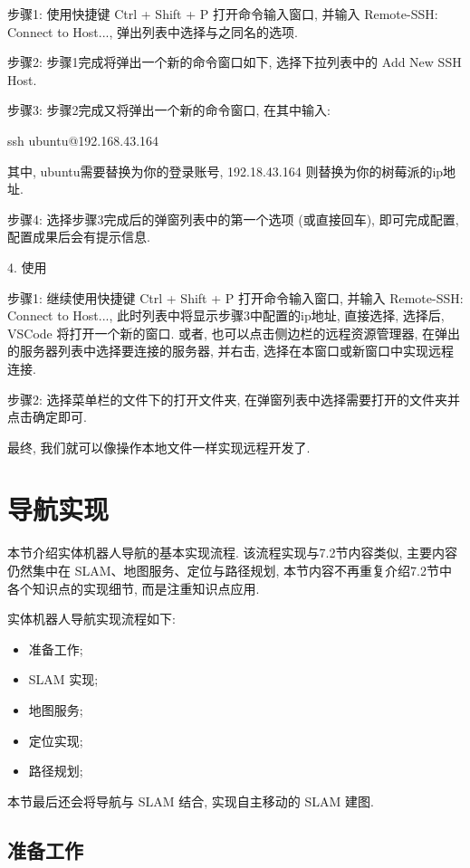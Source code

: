 \documentclass[openany, fontset=windowsold]{ctexbook}
\theoremstyle{kaiti}
\theoremstyle{normal}
\begin{document}
步骤1: 使用快捷键 Ctrl + Shift + P 打开命令输入窗口, 并输入 Remote-SSH: Connect to Host..., 弹出列表中选择与之同名的选项.

步骤2: 步骤1完成将弹出一个新的命令窗口如下, 选择下拉列表中的 Add New SSH Host.

步骤3: 步骤2完成又将弹出一个新的命令窗口, 在其中输入: 

\begin{bash}
  ssh ubuntu@192.168.43.164
\end{bash}

其中, ubuntu需要替换为你的登录账号, 192.18.43.164 则替换为你的树莓派的ip地址.

步骤4: 选择步骤3完成后的弹窗列表中的第一个选项 (或直接回车), 即可完成配置, 配置成果后会有提示信息.

4. 使用

步骤1: 继续使用快捷键 Ctrl + Shift + P 打开命令输入窗口, 并输入 Remote-SSH: Connect to Host..., 此时列表中将显示步骤3中配置的ip地址, 直接选择, 选择后, VSCode 将打开一个新的窗口. 或者, 也可以点击侧边栏的远程资源管理器, 在弹出的服务器列表中选择要连接的服务器, 并右击, 选择在本窗口或新窗口中实现远程连接.

步骤2: 选择菜单栏的文件下的打开文件夹, 在弹窗列表中选择需要打开的文件夹并点击确定即可.

最终, 我们就可以像操作本地文件一样实现远程开发了.

\section{导航实现}

本节介绍实体机器人导航的基本实现流程. 该流程实现与7.2节内容类似, 主要内容仍然集中在 SLAM、地图服务、定位与路径规划, 本节内容不再重复介绍7.2节中各个知识点的实现细节, 而是注重知识点应用.

实体机器人导航实现流程如下:

\begin{itemize}
  \item 准备工作; 
  \item SLAM 实现; 
  \item 地图服务; 
  \item 定位实现; 
  \item 路径规划; 
\end{itemize}

本节最后还会将导航与 SLAM 结合, 实现自主移动的 SLAM 建图.

\subsection{准备工作}
\end{document}
